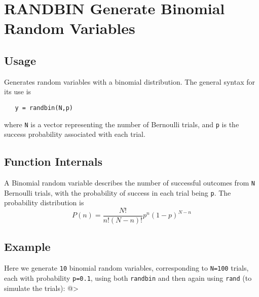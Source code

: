 \section{RANDBIN Generate Binomial Random Variables}

\subsection{Usage}

Generates random variables with a binomial distribution.
The general syntax for its use is
\begin{verbatim}
   y = randbin(N,p)
\end{verbatim}
where \verb|N| is a vector representing the number of Bernoulli
trials, and \verb|p| is the success probability associated with each
trial.
\subsection{Function Internals}

A Binomial random variable describes the number of successful
outcomes from \verb|N| Bernoulli trials, with the probability of
success in each trial being \verb|p|.  The probability distribution
is
\[
   P(n) = \frac{N!}{n!(N-n)!}p^n(1-p)^{N-n}
\]
\subsection{Example}

Here we generate \verb|10| binomial random variables, corresponding
to \verb|N=100| trials, each with probability \verb|p=0.1|, using
both \verb|randbin| and then again using \verb|rand| (to simulate the trials):
@>
